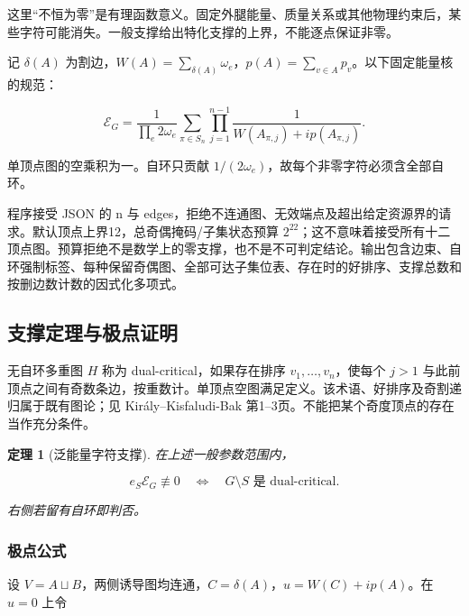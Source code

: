 \documentclass[11pt,a4paper,oneside]{ctexart}
\theoremstyle{cnplain}
\newtheorem{theorem}{定理}[section]
\theoremstyle{definition}
\theoremstyle{remark}
\numberwithin{equation}{section}
\begin{document}
这里``不恒为零''是有理函数意义。固定外腿能量、质量关系或其他物理约束后，某些字符可能消失。一般支撑给出特化支撑的上界，不能逐点保证非零。

记 \(\delta(A)\) 为割边，\(W(A)=\sum_{\delta(A)}\omega_e\)，\(p(A)=\sum_{v\in A}p_v\)。以下固定能量核的规范：

\begin{equation}
\mathscr E_G=
 \frac1{\prod_e2\omega_e}
 \sum_{\pi\in S_n}\prod_{j=1}^{n-1}
 \frac1{W(A_{\pi,j})+ip(A_{\pi,j})}.                 \label{eq:graph:1}
\end{equation}

单顶点图的空乘积为一。自环只贡献 \(1/(2\omega_e)\)，故每个非零字符必须含全部自环。

程序接受 JSON 的 n 与 edges，拒绝不连通图、无效端点及超出给定资源界的请求。默认顶点上界12，总奇偶掩码/子集状态预算 \(2^{22}\)；这不意味着接受所有十二顶点图。预算拒绝不是数学上的零支撑，也不是不可判定结论。输出包含边束、自环强制标签、每种保留奇偶图、全部可达子集位表、存在时的好排序、支撑总数和按删边数计数的因式化多项式。


\subsection{支撑定理与极点证明}\label{sec:graph:2}

无自环多重图 \(H\) 称为 dual-critical，如果存在排序 \(v_1,\ldots,v_n\)，使每个 \(j>1\) 与此前顶点之间有奇数条边，按重数计。单顶点空图满足定义。该术语、好排序及奇割递归属于既有图论；见 Király--Kisfaludi-Bak \cite{dualcritical} 第1--3页。不能把某个奇度顶点的存在当作充分条件。

\begin{theorem}[泛能量字符支撑]

\label{thm:graph:1} 在上述一般参数范围内，

\begin{equation}
e_S\mathscr E_G\not\equiv0
 \quad\Longleftrightarrow\quad G\setminus S\text{ 是 dual-critical}.       \label{eq:graph:2}
\end{equation}

右侧若留有自环即判否。

\end{theorem}

\subsubsection{极点公式}\label{sec:graph:2.1}

设 \(V=A\sqcup B\)，两侧诱导图均连通，\(C=\delta(A)\)，\(u=W(C)+ip(A)\)。在 \(u=0\) 上令
\end{document}
